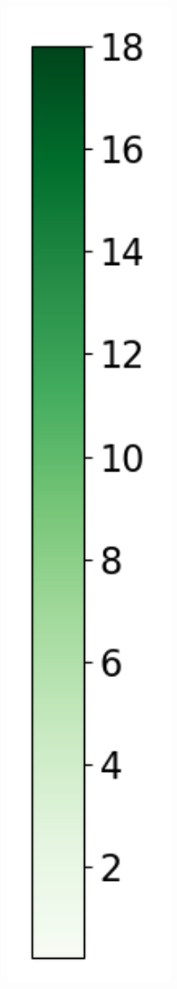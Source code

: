 \begin{figure}[H]
\begin{subfigure}[b]{0.075\textwidth}
        \includegraphics[width=1\textwidth]{Results/kd-laplace/kd-Laplace/heart-dataset/heatmap_legend_distance.png}
    \end{subfigure}
\end{figure}
